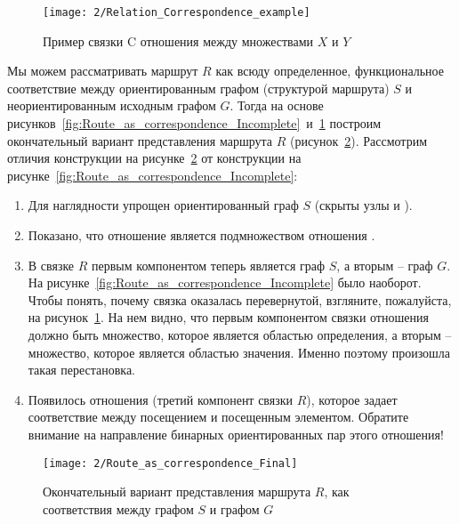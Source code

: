 \begin{figure}[h!]
  \centering
  \texttt{[image: 2/Relation\_Correspondence\_example]}
  \caption{Пример связки C отношения  между
    множествами $X$ и $Y$}
  \label{fig:Relation_Correspondence_example}
\end{figure}

Мы можем рассматривать маршрут $R$ как всюду определенное,
функциональное соответствие между ориентированным графом (структурой
маршрута) $S$ и неориентированным исходным графом $G$.  Тогда на
основе
рисунков~\ref{fig:Route_as_correspondence_Incomplete}~и~\ref{fig:Relation_Correspondence_example}
построим окончательный вариант представления маршрута $R$
(рисунок~\ref{fig:Route_as_correspondence_Final}). Рассмотрим отличия
конструкции на рисунке~\ref{fig:Route_as_correspondence_Final} от
конструкции на рисунке~\ref{fig:Route_as_correspondence_Incomplete}:

\begin{enumerate}
\item Для наглядности упрощен ориентированный граф $S$ (скрыты узлы
   и ).
\item Показано, что отношение  является подмножеством
  отношения .
\item В связке $R$ первым компонентом теперь является граф $S$, а
  вторым – граф $G$. На
  рисунке~\ref{fig:Route_as_correspondence_Incomplete} было
  наоборот. Чтобы понять, почему связка оказалась перевернутой,
  взгляните, пожалуйста, на
  рисунок~\ref{fig:Relation_Correspondence_example}. На нем видно, что
  первым компонентом связки отношения  должно быть
  множество, которое является областью определения, а вторым –
  множество, которое является областью значения. Именно поэтому
  произошла такая перестановка.
\item Появилось отношения (третий компонент связки $R$), которое задает
  соответствие между посещением и посещенным элементом. Обратите
  внимание на направление бинарных ориентированных пар этого
  отношения!
\end{enumerate}

\begin{figure}[h!]
  \centering
  \texttt{[image: 2/Route\_as\_correspondence\_Final]}
  \caption{Окончательный вариант представления маршрута $R$, как
    соответствия между графом $S$ и графом $G$}
  \label{fig:Route_as_correspondence_Final}
\end{figure}

